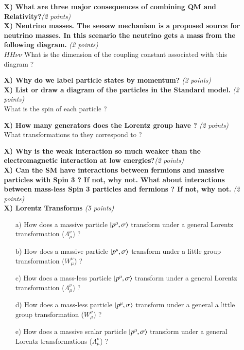 {\large


\textbf{X) What are three major consequences of combining QM and Relativity?}\hfill \textit{(2 points)}\\


\textbf{X) Neutrino masses. The seesaw mechanism is a proposed source for neutrino masses. In this scenario the neutrino gets a mass from the following diagram.} \hfill \textit{(2 points)}\\
$HH\nu\nu $
What is the dimension of the coupling constant associated with this diagram ?


\textbf{X) Why do we label particle states by momentum? } \hfill \textit{(2 points)}\\


\textbf{X) List or draw a diagram of the particles in the Standard model. } \hfill \textit{(2 points)}\\
What is the spin of each particle ?

\textbf{X)  How many generators does the Lorentz group have ? }\hfill \textit{(2 points)}\\
What transformations to they correspond to ?

\textbf{X) Why is the weak interaction so much weaker than the electromagnetic interaction at low energies?}\hfill \textit{(2 points)}\\

\textbf{X) Can the SM have interactions between fermions and massive particles with Spin 3 ? If not, why not.  What about interactions between mass-less Spin 3 particles and fermions ? If not, why not. }\hfill \textit{(2 points)}\\


\textbf{X) Lorentz Transforms } \hfill \textit{(5 points)}\\
\begin{itemize}
\item[a)] How does a massive particle $\ket{p^\mu,\sigma}$ transform under a general Lorentz transformation ($\Lambda_\mu^\nu$)  ?
\item[b)] How does a massive particle $\ket{p^\mu,\sigma}$ transform under a little group transformation ($W_\mu^\nu$)  ?
\item[c)] How does a mass-less particle $\ket{p^\mu,\sigma}$ transform under a general Lorentz transformation ($\Lambda_\mu^\nu$)  ?
\item[d)] How does a mass-less particle $\ket{p^\mu,\sigma}$ transform under a general a little group transformation ($W_\mu^\nu$)  ?
\item[e)] How does a massive scalar particle $\ket{p^\mu,\sigma}$ transform under a general Lorentz transformations ($\Lambda_\mu^\nu$) ?
\end{itemize}


}
